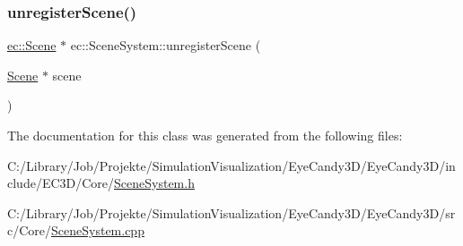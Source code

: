\mbox{\label{classec_1_1_scene_system_ae00450951bc3220dd9899d75bdd207c4}} 
\subsubsection{\texorpdfstring{unregister\+Scene()}{unregisterScene()}}
{\footnotesize\ttfamily \mbox{\hyperlink{classec_1_1_scene}{ec\+::\+Scene}} $\ast$ ec\+::\+Scene\+System\+::unregister\+Scene (\begin{DoxyParamCaption}\item[{\mbox{\hyperlink{classec_1_1_scene}{Scene}} $\ast$}]{scene }\end{DoxyParamCaption})}



The documentation for this class was generated from the following files\+:\begin{DoxyCompactItemize}
\item 
C\+:/\+Library/\+Job/\+Projekte/\+Simulation\+Visualization/\+Eye\+Candy3\+D/\+Eye\+Candy3\+D/include/\+E\+C3\+D/\+Core/\mbox{\hyperlink{_scene_system_8h}{Scene\+System.\+h}}\item 
C\+:/\+Library/\+Job/\+Projekte/\+Simulation\+Visualization/\+Eye\+Candy3\+D/\+Eye\+Candy3\+D/src/\+Core/\mbox{\hyperlink{_scene_system_8cpp}{Scene\+System.\+cpp}}\end{DoxyCompactItemize}
